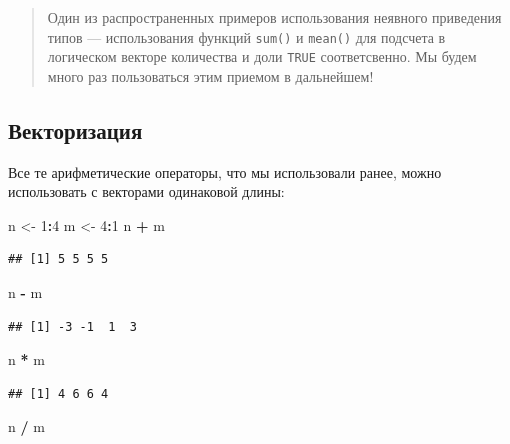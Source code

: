 \documentclass[
]{book}
\newenvironment{Shaded}{\begin{snugshade}}{\end{snugshade}}
\newcommand{\DecValTok}[1]{\textcolor[rgb]{0.00,0.00,0.81}{#1}}
\newcommand{\NormalTok}[1]{#1}
\newcommand{\OperatorTok}[1]{\textcolor[rgb]{0.81,0.36,0.00}{\textbf{#1}}}
\newcommand{\StringTok}[1]{\textcolor[rgb]{0.31,0.60,0.02}{#1}}
\begin{document}
\begin{quote}
Один из распространенных примеров использования неявного приведения типов --- использования функций \texttt{sum()} и \texttt{mean()} для подсчета в логическом векторе количества и доли \texttt{TRUE} соответсвенно. Мы будем много раз пользоваться этим приемом в дальнейшем!
\end{quote}

\hypertarget{vector_op}{%
\subsection{Векторизация}\label{vector_op}}

Все те арифметические операторы, что мы использовали ранее, можно использовать с векторами одинаковой длины:

\begin{Shaded}
\begin{Highlighting}[]
\NormalTok{n <-}\StringTok{ }\DecValTok{1}\OperatorTok{:}\DecValTok{4}
\NormalTok{m <-}\StringTok{ }\DecValTok{4}\OperatorTok{:}\DecValTok{1}
\NormalTok{n }\OperatorTok{+}\StringTok{ }\NormalTok{m}
\end{Highlighting}
\end{Shaded}

\begin{verbatim}
## [1] 5 5 5 5
\end{verbatim}

\begin{Shaded}
\begin{Highlighting}[]
\NormalTok{n }\OperatorTok{-}\StringTok{ }\NormalTok{m}
\end{Highlighting}
\end{Shaded}

\begin{verbatim}
## [1] -3 -1  1  3
\end{verbatim}

\begin{Shaded}
\begin{Highlighting}[]
\NormalTok{n }\OperatorTok{*}\StringTok{ }\NormalTok{m}
\end{Highlighting}
\end{Shaded}

\begin{verbatim}
## [1] 4 6 6 4
\end{verbatim}

\begin{Shaded}
\begin{Highlighting}[]
\NormalTok{n }\OperatorTok{/}\StringTok{ }\NormalTok{m}
\end{Highlighting}
\end{Shaded}
\end{document}
